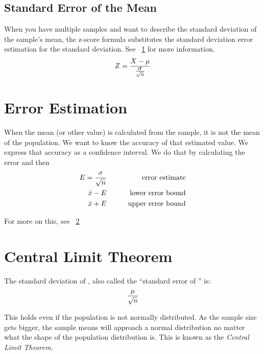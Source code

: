 	\subsection{Standard Error of the Mean}
When you have multiple samples and want to describe the standard deviation of the sample's mean, the z-score formula substitutes the standard deviation error estimation for the standard deviation.  See \sectionname~\ref{sec:errorestimation} for more information.
	\begin{equation}
		Z = \frac{X-\mbox{$\mu$}}{\frac{\mbox{$\sigma$}}{\sqrt{n}}	}
	\end{equation}

	\section{Error Estimation}
	\label{sec:errorestimation}
When the mean (or other value) is calculated from the sample, it is not the mean of the population.  We want to know the accuracy of that estimated value.  We express that accuracy as a confidence interval.  We do that by calculating the error and then
	\begin{eqnarray}
		E = \frac{\mbox{$\sigma$}}{\sqrt{n}}	& \quad\quad & \text{error estimate}	\\
		\mbox{$\bar{x}$} - E								& 		& \text{lower error bound}				\\
		\mbox{$\bar{x}$} + E								& 		& \text{upper error bound}
	\end{eqnarray}
	\begin{mathwhere}[0.38in]
	\end{mathwhere}
For more on this, see \sectionname~\ref{sec:centrallimittheorem}

	\section{Central Limit Theorem}
	\label{sec:centrallimittheorem}
The standard deviation of \samplemean{}, also called the ``standard error of \samplemean{}'' is:
	\begin{equation}
		\frac{\mbox{$\mu$}}{\sqrt{n}}
	\end{equation}
	\begin{mathwhere}
	\end{mathwhere}
This holds even if the population is not normally distributed.  As the sample size gets bigger, the sample means will approach a normal distribution no matter what the shape of the population distribution is.  This is known as the \textit{Central Limit Theorem}.

